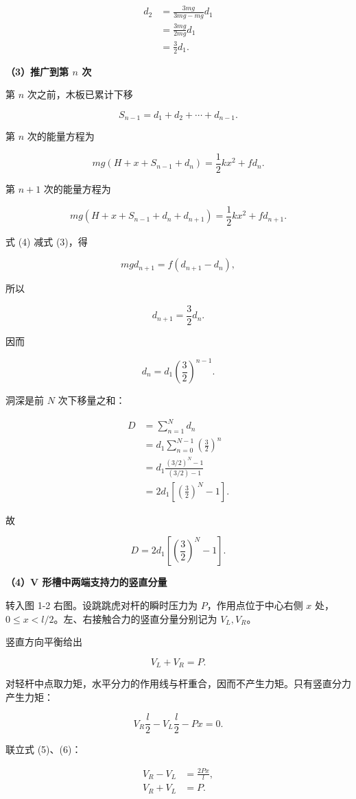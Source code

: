 \documentclass[12pt,a4paper,UTF8]{ctexart}
\begin{document}
\[
\begin{aligned}
d_2
&=\frac{3mg}{3mg-mg}d_1\\
&=\frac{3mg}{2mg}d_1\\
&=\frac32d_1.
\end{aligned}
\]

\textbf{（3）推广到第 \(n\) 次}

第 \(n\) 次之前，木板已累计下移

\[S_{n-1}=d_1+d_2+\cdots+d_{n-1}.\]

第 \(n\) 次的能量方程为

\[
mg(H+x+S_{n-1}+d_n)=\frac12kx^2+fd_n. \tag{3}
\]

第 \(n+1\) 次的能量方程为

\[
mg(H+x+S_{n-1}+d_n+d_{n+1})=\frac12kx^2+fd_{n+1}. \tag{4}
\]

式 (4) 减式 (3)，得

\[
mgd_{n+1}=f(d_{n+1}-d_n),
\]

所以

\[
\boxed{d_{n+1}=\frac32d_n}.
\]

因而

\[
d_n=d_1\left(\frac32\right)^{n-1}.
\]

洞深是前 \(N\) 次下移量之和：

\[
\begin{aligned}
D
&=\sum_{n=1}^{N}d_n\\
&=d_1\sum_{n=0}^{N-1}\left(\frac32\right)^n\\
&=d_1\frac{(3/2)^N-1}{(3/2)-1}\\
&=2d_1\left[\left(\frac32\right)^N-1\right].
\end{aligned}
\]

故

\[
\boxed{D=2d_1\left[\left(\frac32\right)^N-1\right]}.
\]

\textbf{（4）V 形槽中两端支持力的竖直分量}

转入图 1-2 右图。设跳跳虎对杆的瞬时压力为 \(P\)，作用点位于中心右侧
\(x\) 处，\(0\le x<l/2\)。左、右接触合力的竖直分量分别记为 \(V_L,V_R\)。

竖直方向平衡给出

\[V_L+V_R=P. \tag{5}\]

对轻杆中点取力矩，水平分力的作用线与杆重合，因而不产生力矩。只有竖直分力产生力矩：

\[
V_R\frac l2-V_L\frac l2-Px=0. \tag{6}
\]

联立式 (5)、(6)：

\[
\begin{aligned}
V_R-V_L&=\frac{2Px}{l},\\
V_R+V_L&=P.
\end{aligned}
\]
\end{document}
